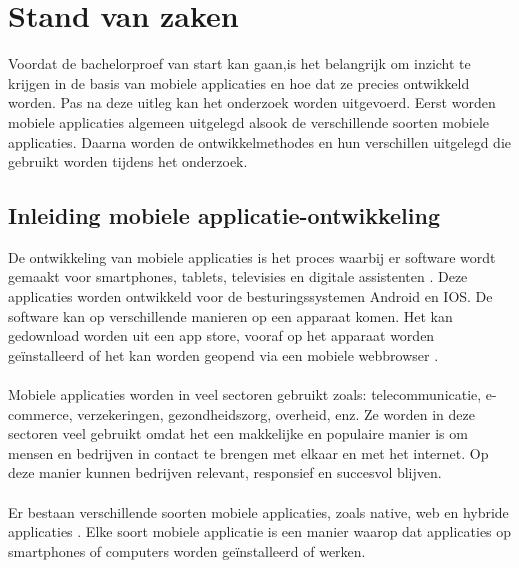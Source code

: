 \chapter{Stand van zaken}
\label{ch:stand-van-zaken}




Voordat de bachelorproef van start kan gaan,is het belangrijk om inzicht te 
krijgen in de basis van mobiele applicaties en hoe dat ze precies ontwikkeld worden. 
Pas na deze uitleg kan het onderzoek worden uitgevoerd. Eerst worden mobiele applicaties 
algemeen uitgelegd alsook de verschillende soorten mobiele applicaties. 
Daarna worden de ontwikkelmethodes en hun verschillen uitgelegd die gebruikt worden tijdens het 
onderzoek.

\section{Inleiding mobiele applicatie-ontwikkeling}

De ontwikkeling van mobiele applicaties is het proces waarbij er software wordt 
gemaakt voor smartphones, tablets, televisies en digitale assistenten \autocite{Palko2021}. 
Deze applicaties worden ontwikkeld voor de besturingssystemen Android en IOS. 
De software kan op verschillende manieren op een apparaat komen. Het kan gedownload 
worden uit een app store, vooraf op het apparaat worden geïnstalleerd of het kan worden 
geopend via een mobiele webbrowser \autocite{IBM2023}. 
\\\\
Mobiele applicaties worden in veel sectoren gebruikt zoals: telecommunicatie, 
e-commerce, verzekeringen, gezondheidszorg, overheid, enz. Ze worden in deze sectoren 
veel gebruikt omdat het een makkelijke en populaire manier is om mensen en bedrijven in contact te brengen 
met elkaar en met het internet. Op deze manier kunnen bedrijven relevant, responsief 
en succesvol blijven. 
\\\\
Er bestaan verschillende soorten mobiele applicaties, zoals native, web en hybride 
applicaties \autocite{AWS2023}. Elke soort mobiele applicatie is een manier waarop dat 
applicaties op smartphones of computers worden geïnstalleerd of werken.

